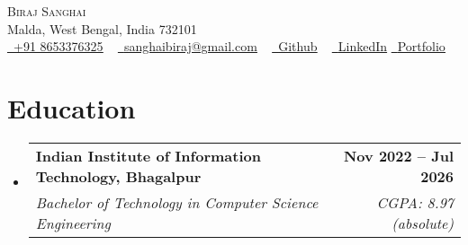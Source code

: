 \documentclass[letterpaper,11pt]{article}
\makeatletter
\newcommand{\resumeItem}[1]{
  \item\small{
    {#1 \vspace{-2pt}}
  }
}
\newcommand{\resumeSubheading}[4]{
  \vspace{-5pt}\item
    \begin{tabular*}{1.0\textwidth}[t]{l@{\extracolsep{\fill}}r}
      \textbf{#1} & \textbf{\small #2} \\
      \textit{\small#3} & \textit{\small #4} \\
    \end{tabular*}\vspace{-5pt}
}
\newcommand{\collegeItem}[1]{
    \item
    \begin{tabular*}{0.97\textwidth}{l@{\extracolsep{\fill}}r}
      \textit{\small#1} & \textit{\small } \\
    \end{tabular*}\vspace{-4pt}
}
\newcommand{\resumeSubHeadingListStart}{\begin{itemize}[leftmargin=0.0in, label={}]}
\newcommand{\resumeSubHeadingListEnd}{\end{itemize}}
\makeatother
\begin{document}

\begin{center}
    {\Huge \scshape Biraj Sanghai} \\ \vspace{1pt}
    Malda, West Bengal, India 732101 \\ \vspace{1pt}
    \href{tel:918653376325}{\color{Blue} \raisebox{-0.2\height}\faPhone\
    \underline {+91 8653376325}} ~ \href{mailto:sanghaibiraj@gmail.com}{\color{Blue} \raisebox{-0.2\height}\faEnvelope\  \underline{sanghaibiraj@gmail.com}} ~ 
    \href{https://github.com/sanghaibiraj}{\color{Blue} \raisebox{-0.2\height}\faGithub\ \underline{Github}} ~ 
    \href{https://www.linkedin.com/in/biraj-sanghai-iiitbh}{\color{Blue} \raisebox{-0.2\height}\faLinkedin\ \underline{LinkedIn}}
    \hspace{2pt}
    \href{https://biraj-sanghai.vercel.app/}{\color{Blue} 
    \raisebox{-0.2\height}\faGlobe\ \underline{Portfolio}}
    \vspace{-8pt}
\end{center}


\section{Education}
  \resumeSubHeadingListStart
  \vspace{4pt}
    \resumeSubheading
      {Indian Institute of Information Technology, Bhagalpur}{Nov 2022 -- Jul 2026}
      {Bachelor of Technology in Computer Science Engineering}{CGPA: 8.97 (absolute)}
  \resumeSubHeadingListEnd
  \vspace{-12pt}

\end{document}
